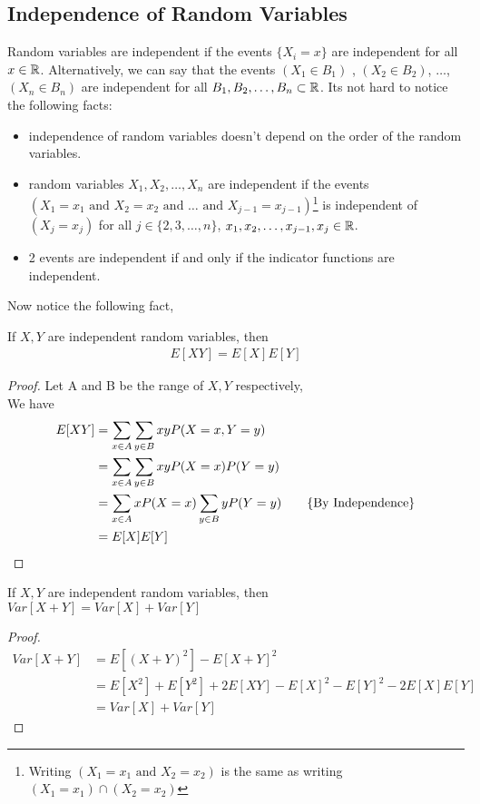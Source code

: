 \subsection{Independence of Random Variables}
Random variables are independent if the events $\{X_i=x\}$ are independent for all $x \in \mathbb{R}$. Alternatively, we can say that the events $(X_1 \in B_1)$ , $(X_2 \in B_2)$, $\ldots$, $(X_n \in B_n)$ are independent for all $B_1,B_2,\ldots,B_n \subset \mathbb{R}$.
Its not hard to notice the following facts:
\begin{itemize}
    \item independence of random variables doesn't depend on the order of the random variables.
    \item random variables $X_1, X_2, \ldots, X_n$ are independent if the events $(X_1=x_1 \text{ and } X_2=x_2 \text{ and } \ldots \text{ and } X_{j-1}=x_{j-1})$\footnote{Writing $(X_1=x_1 \text{ and } X_2=x_2)$ is the same as writing $(X_1=x_1) \cap (X_2=x_2)$} 
    is independent of $(X_j=x_j)$ for all $j \in \{2,3,\ldots,n\}$, $x_1,x_2,\ldots,x_{j-1},x_j \in \mathbb{R}$.
    \item 2 events are independent if and only if the indicator functions are independent.
\end{itemize}
Now notice the following fact, 
\begin{theorem}
If $X,Y$ are independent random variables, then 
\begin{align}
    E[XY]=E[X]E[Y]
\end{align}
\end{theorem}
\begin{proof}
    Let A and B be the range of $X,Y$ respectively,\\
    We have
    \begin{align*}
        E[XY]&=\sum_{x \in A}\sum_{y \in B}{xyP(X=x,Y=y)} \\
        &=\sum_{x \in A}\sum_{y \in B}{xyP(X=x)P(Y=y)} \\
        &=\sum_{x \in A}{xP(X=x)}\sum_{y \in B}{yP(Y=y)} \tag*{\{By Independence\}} \\ 
        &=E[X]E[Y]
    \end{align*}
\end{proof}
\begin{corollary}
    If $X,Y$ are independent random variables, then $Var[X+Y]=Var[X]+Var[Y]$
\end{corollary}
\begin{proof}
    \begin{align*}
        Var[X+Y]&=E[(X+Y)^2]-E[X+Y]^2 \\
        &=E[X^2]+E[Y^2]+2E[XY]-E[X]^2-E[Y]^2-2E[X]E[Y] \\
        &=Var[X]+Var[Y]
    \end{align*}
\end{proof}

